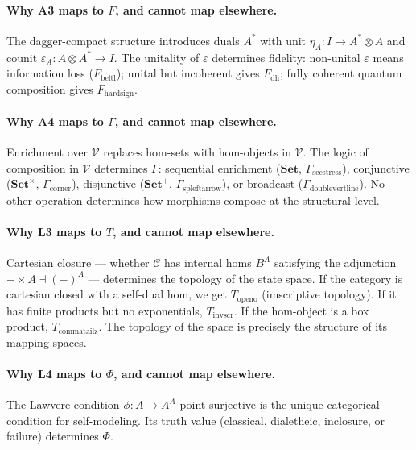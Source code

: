 \documentclass[12pt,a4paper]{article}
\begin{document}
\paragraph{Why A3 maps to $F$, and cannot map elsewhere.}
The dagger-compact structure introduces duals $A^*$ with unit $\eta_A: I \to A^* \otimes A$ and counit $\varepsilon_A: A \otimes A^* \to I$. The unitality of $\varepsilon$ determines fidelity: non-unital $\varepsilon$ means information loss ($F_{\text{beltl}}$); unital but incoherent gives $F_{\text{dh}}$; fully coherent quantum composition gives $F_{\text{hardsign}}$.

\paragraph{Why A4 maps to $\Gamma$, and cannot map elsewhere.}
Enrichment over $\mathcal{V}$ replaces hom-sets with hom-objects in $\mathcal{V}$. The logic of composition in $\mathcal{V}$ determines $\Gamma$: sequential enrichment ($\mathbf{Set}$, $\Gamma_{\text{secstress}}$), conjunctive ($\mathbf{Set}^\times$, $\Gamma_{\text{corner}}$), disjunctive ($\mathbf{Set}^+$, $\Gamma_{\text{spleftarrow}}$), or broadcast ($\Gamma_{\text{doublevertline}}$). No other operation determines how morphisms compose at the structural level.

\paragraph{Why L3 maps to $T$, and cannot map elsewhere.}
Cartesian closure --- whether $\mathcal{C}$ has internal homs $B^A$ satisfying the adjunction $-\times A \dashv (-)^A$ --- determines the topology of the state space. If the category is cartesian closed with a self-dual hom, we get $T_{\text{openo}}$ (imscriptive topology). If it has finite products but no exponentials, $T_{\text{invscr}}$. If the hom-object is a box product, $T_{\text{commatailz}}$. The topology of the space is precisely the structure of its mapping spaces.

\paragraph{Why L4 maps to $\Phi$, and cannot map elsewhere.}
The Lawvere condition $\phi: A \to A^A$ point-surjective is the unique categorical condition for self-modeling. Its truth value (classical, dialetheic, inclosure, or failure) determines $\Phi$.
\end{document}
